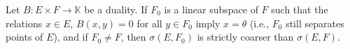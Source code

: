 Let $B: E \times F \to \mathbb{K}$ be a duality. If $F_0$ is a linear subspace of $F$ such that the relations $x \in E$, $B(x, y) = 0$ for all $y \in F_0$ imply $x = \theta$ (i.e., $F_0$ still separates points of $E$), and if $F_0 \neq F$, then $\sigma(E, F_0)$ is strictly coarser than $\sigma(E, F)$.
